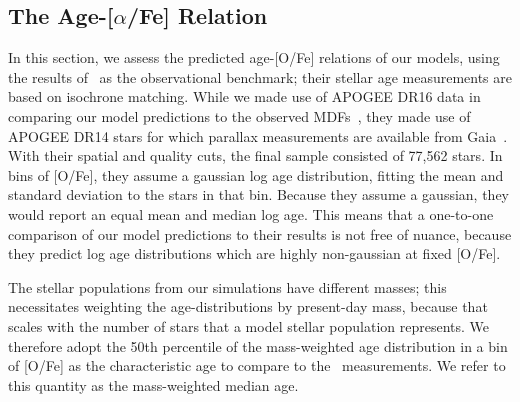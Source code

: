 \documentclass[fleqn, usenatbib]{mnras}
\begin{document}
\subsection{The Age-[$\alpha$/Fe] Relation} 
\label{sec:obs_comp:age_alpha} 
In this section, we assess the predicted age-[O/Fe] relations of our models, 
using the results of~\citet{Feuillet2019} as the observational benchmark; their 
stellar age measurements are based on isochrone matching. While we made 
use of APOGEE DR16 data in comparing our model predictions to the observed 
MDFs~\citep[][see~\S~\ref{sec:obs_comp:mdfs}]{Ahumada2020, Majewski2017}, they 
made use of APOGEE DR14 stars for which parallax measurements are available 
from Gaia~\citep{Abolfathi2014, GaiaDR2}. With their spatial and quality cuts, 
the final 
sample consisted of 77,562 stars. In bins of [O/Fe], they assume a gaussian 
log age distribution, fitting the mean and standard deviation to the stars in 
that bin. Because they assume a gaussian, they would report an equal mean 
and median log age. This means that a one-to-one comparison of our model 
predictions to their results is not free of nuance, because they predict 
log age distributions which are highly non-gaussian at fixed [O/Fe]. 
\par 
The stellar populations from our simulations have different masses; this 
necessitates weighting the age-distributions by present-day mass, because that 
scales with the number of stars that a model stellar population represents. We 
therefore adopt the 50th percentile of the mass-weighted age distribution in a 
bin of [O/Fe] as the characteristic age to compare to the~\citet{Feuillet2019} 
measurements. We refer to this quantity as the mass-weighted median age. 
\end{document}
